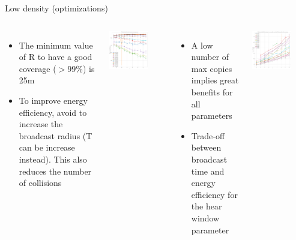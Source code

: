 \documentclass[aspectratio=169]{beamer}
\begin{document}
\begin{frame}{Low density (optimizations)}
	\footnotesize
	\begin{columns}
	        \begin{itemize}
	        \item The minimum value of R to have a good coverage (\(> 99\%\)) is 25m
	        \item To improve energy efficiency, avoid to increase
			the broadcast radius (T can be increase
			instead). This also reduces the number of collisions
	        \end{itemize}
	        \begin{center}
	            \includegraphics[width=0.7\textwidth]{img/ld/messages-R-ffplot.png}
	        \end{center}
	        \begin{itemize}
	        \item A low number of max copies implies great benefits for all parameters
	        \item Trade-off between broadcast time and energy efficiency for the hear window parameter
	        \end{itemize}
	        \begin{center}
	            \includegraphics[width=0.7\textwidth]{img/ld/broadcasttime-T-ffplot.png}
	        \end{center}
	\end{columns}
\end{frame}
\end{document}
